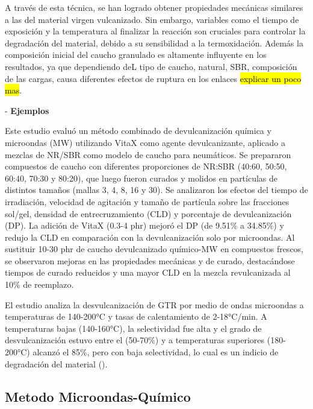 \begin{multicols}{2}
A través de esta técnica, se han logrado obtener propiedades mecánicas similares a las del material virgen vulcanizado. Sin embargo, variables como el tiempo de exposición y la temperatura al finalizar la reacción son cruciales para controlar la degradación del material, debido a su sensibilidad a la termoxidación. Además la composición inicial del caucho granulado es altamente influyente en los resultados, ya que dependiendo deL tipo de caucho, natural, SBR, composición de las cargas, causa diferentes efectos de ruptura en los enlaces \hl{explicar un poco mas}. 

- \textbf{Ejemplos}

Este estudio evaluó un método combinado de devulcanización química y microondas (MW) utilizando VitaX como agente devulcanizante, aplicado a mezclas de NR/SBR como modelo de caucho para neumáticos. Se prepararon compuestos de caucho con diferentes proporciones de NR:SBR (40:60, 50:50, 60:40, 70:30 y 80:20), que luego fueron curados y molidos en partículas de distintos tamaños (mallas 3, 4, 8, 16 y 30). Se analizaron los efectos del tiempo de irradiación, velocidad de agitación y tamaño de partícula sobre las fracciones sol/gel, densidad de entrecruzamiento (CLD) y porcentaje de devulcanización (DP). La adición de VitaX (0.3-4 phr) mejoró el DP (de 9.51\% a 34.85\%) y redujo la CLD en comparación con la devulcanización solo por microondas. Al sustituir 10-30 phr de caucho devulcanizado químico-MW en compuestos frescos, se observaron mejoras en las propiedades mecánicas y de curado, destacándose tiempos de curado reducidos y una mayor CLD en la mezcla revulcanizada al 10\% de reemplazo.

El estudio analiza la desvulcanización de GTR por medio de ondas microondas a temperaturas de 140-200°C y tasas de calentamiento de 2-18°C/min. A temperaturas bajas (140-160°C), la selectividad fue alta y el grado de desvulcanización estuvo entre el (50-70\%) y a temperaturas superiores (180-200°C) alcanzó el 85\%, pero con baja selectividad, lo cual es un indicio de degradación del material (\cite{Simon2021}). %

\subsection{\textbf{\large{Metodo Microondas-Químico}    }}    


\end{multicols}
